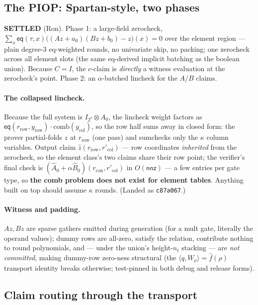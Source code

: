 \documentclass[11pt]{article}
\newcommand{\eq}{\mathsf{eq}}
\newcommand{\nnz}{\mathsf{nnz}}
\newcommand{\ip}[2]{\langle #1, #2 \rangle}
\newcommand{\code}[1]{\texttt{#1}}
\newcommand{\settled}[1]{\medskip\noindent\textbf{SETTLED} (#1).\xspace}
\theoremstyle{definition}
\begin{document}
\subsection{The PIOP: Spartan-style, two phases}

\settled{Ron} Phase 1: a large-field zerocheck,
$\sum_x \eq(\tau,x)\bigl((A z + a_0)(Bz + b_0) - z\bigr)(x) = 0$ over the
element region --- plain degree-3 eq-weighted rounds, no univariate skip,
no packing; one zerocheck across all element slots (the same eq-derived
implicit batching as the boolean union). Because $C = I$, the $c$-claim is
\emph{directly} a witness evaluation at the zerocheck's point. Phase 2: an
$\alpha$-batched lincheck for the $A$/$B$ claims.

\paragraph{The collapsed lincheck.} Because the full system is
$I_{2^\nu} \otimes A_0$, the lincheck weight factors as
$\eq(r_{\mathrm{row}}, y_{\mathrm{row}})\cdot \mathrm{comb}(y_{\mathrm{col}})$,
so the row half sums away in closed form: the prover partial-folds $z$ at
$r_{\mathrm{row}}$ (one pass) and sumchecks only the $\kappa$ column
variables. Output claim $\hat z(r_{\mathrm{row}}, r'_{\mathrm{col}})$ ---
row coordinates \emph{inherited} from the zerocheck, so the element
class's two claims share their row point; the verifier's final check is
$(\hat A_0 + \alpha \hat B_0)(r_{\mathrm{con}}, r'_{\mathrm{col}})$ in
$O(\nnz)$ --- a few entries per gate type, so \textbf{the comb problem
does not exist for element tables}. Anything built on top should assume
$\kappa$ rounds. (Landed as \code{c87a067}.)

\paragraph{Witness and padding.} $Az, Bz$ are sparse gathers emitted
during generation (for a mult gate, literally the operand values); dummy
rows are all-zero, satisfy the relation, contribute nothing to round
polynomials, and --- under the union's height-$n_t$ stacking --- are
\emph{not committed}, making dummy-row zero-ness structural (the
$\ip{q}{W_\rho} = \hat f(\rho)$ transport identity breaks otherwise;
test-pinned in both debug and release forms).

\subsection{Claim routing through the transport}\label{sec:routing}
\end{document}

